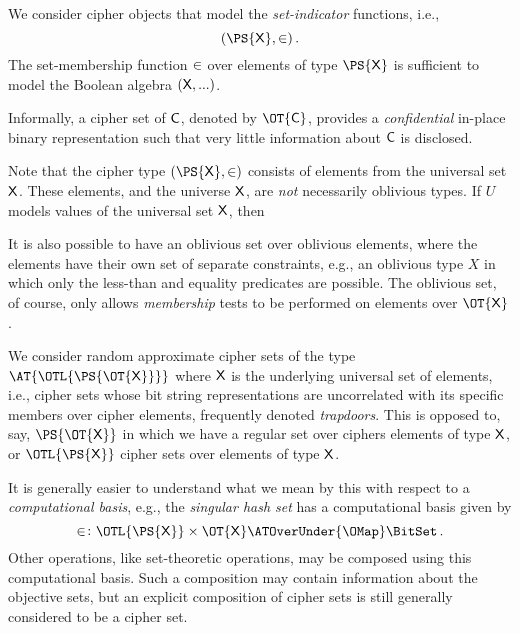 \documentclass[ ../main.tex]{subfiles}
\begin{document}
We consider cipher objects that model the \emph{set-indicator} functions, i.e.,
\begin{equation}
    (\PS{\Set{X}}, \SetContains)\,.
\end{equation}
The set-membership function $\SetContains$ over elements of type $\PS{\Set{X}}$ is sufficient to model the Boolean algebra $(\Set{X},...)$.

Informally, a cipher set of $\Set{C}$, denoted by $\OT{\Set{C}}$, provides a \emph{confidential} in-place binary representation such that very little information about $\Set{C}$ is disclosed.

Note that the cipher type $(\PS{\Set{X}}, \SetContains)$ consists of elements from the universal set $\Set{X}$.
These elements, and the universe $\Set{X}$, are \emph{not} necessarily oblivious types.
If $U$ models values of the universal set $\Set{X}$, then 

It is also possible to have an oblivious set over oblivious elements, where the elements have their own set of separate constraints, e.g., an oblivious type $X$ in which only the less-than and equality predicates are possible.
The oblivious set, of course, only allows \emph{membership} tests to be performed on elements over $\OT{\Set{X}}$.




We consider random approximate cipher sets of the type $\AT{\OTL{\PS{\OT{\Set{X}}}}}$ where $\Set{X}$ is the underlying universal set of elements, i.e., cipher sets whose bit string representations are uncorrelated with its specific members over cipher elements, frequently denoted \emph{trapdoors}.
This is opposed to, say, $\PS{\OT{\Set{X}}}$ in which we have a regular set over ciphers elements of type $\Set{X}$, or $\OTL{\PS{\Set{X}}}$ cipher sets over elements of type $\Set{X}$.

It is generally easier to understand what we mean by this with respect to a \emph{computational basis}, e.g., the 
\emph{singular hash set} has a computational basis given by
\begin{equation}
	\SetContains \colon \OTL{\PS{\Set{X}}} \times \OT{\Set{X}} \ATOverUnder{\OMap} \BitSet\,.
\end{equation}
Other operations, like set-theoretic operations, may be composed using this computational basis.
Such a composition may contain information about the objective sets, but an explicit composition of cipher sets is still generally considered to be a cipher set.
\end{document}
